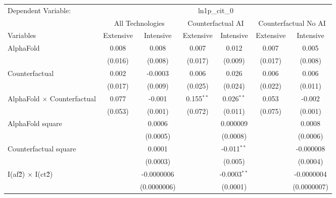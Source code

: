 \begingroup
\centering
\begin{tabular}{lcccccc}
   \tabularnewline \midrule \midrule
   Dependent Variable: & \multicolumn{6}{c}{ln1p\_cit\_0}\\
 & \multicolumn{2}{c}{All Technologies} & \multicolumn{2}{c}{Counterfactual AI} & \multicolumn{2}{c}{Counterfactual No AI} \\
\cmidrule(lr){1-1}\cmidrule(lr){2-3} \cmidrule(lr){4-5} \cmidrule(lr){6-7}
Variables & \multicolumn{1}{c}{Extensive} & \multicolumn{1}{c}{Intensive} & \multicolumn{1}{c}{Extensive} & \multicolumn{1}{c}{Intensive} & \multicolumn{1}{c}{Extensive} & \multicolumn{1}{c}{Intensive} \\
\cmidrule(lr){1-1}\cmidrule(lr){2-2} \cmidrule(lr){3-3} \cmidrule(lr){4-4} \cmidrule(lr){5-5} \cmidrule(lr){6-6} \cmidrule(lr){7-7}
   AlphaFold                          & 0.008   & 0.008       & 0.007        & 0.012          & 0.007   & 0.005\\   
                                      & (0.016) & (0.008)     & (0.017)      & (0.009)        & (0.017) & (0.008)\\   
   Counterfactual                     & 0.002   & -0.0003     & 0.006        & 0.026          & 0.006   & 0.006\\   
                                      & (0.017) & (0.009)     & (0.025)      & (0.024)        & (0.022) & (0.011)\\   
   AlphaFold $\times$ Counterfactual  & 0.077   & -0.001      & 0.155$^{**}$ & 0.026$^{**}$   & 0.053   & -0.002\\   
                                      & (0.053) & (0.001)     & (0.072)      & (0.011)        & (0.075) & (0.001)\\   
   AlphaFold square                   &         & 0.0006      &              & 0.000009       &         & 0.0008\\   
                                      &         & (0.0005)    &              & (0.0008)       &         & (0.0006)\\   
   Counterfactual square              &         & 0.0001      &              & -0.011$^{**}$  &         & -0.000008\\   
                                      &         & (0.0003)    &              & (0.005)        &         & (0.0004)\\   
   I(af\^2) $\times$ I(ct\^2)         &         & -0.0000006  &              & -0.0003$^{**}$ &         & -0.0000004\\   
                                      &         & (0.0000006) &              & (0.0001)       &         & (0.0000007)\\   

\end{tabular}
